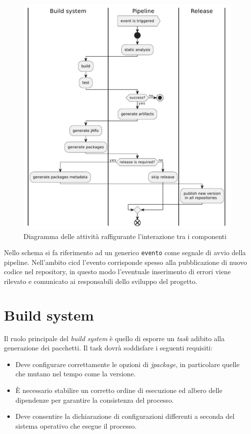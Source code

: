 \begin{figure}[H]
	\centering
	\includegraphics[width=.9\linewidth]{figures/activity-interaction-diagram.pdf}
	\caption{Diagramma delle attività raffigurante l'interazione tra i componenti}
	\label{fig:activity-interaction-diagram}
\end{figure}

Nello schema si fa riferimento ad un generico \texttt{evento} come segnale di avvio della pipeline. Nell'ambito \ac{cicd} l'evento corrisponde spesso alla pubblicazione di nuovo codice nel repository, in questo modo l'eventuale inserimento di errori viene rilevato e comunicato ai responsabili dello sviluppo del progetto.

\section{Build system}

Il ruolo principale del \textit{build system} è quello di esporre un \textit{task} adibito alla generazione dei pacchetti. Il task dovrà soddisfare i seguenti requisiti:
\begin{itemize}
	\item Deve configurare correttamente le opzioni di \textit{jpackage}, in particolare quelle che mutano nel tempo come la versione.
	\item È necessario stabilire un corretto ordine di esecuzione ed albero delle dipendenze per garantire la consistenza del processo.
	\item Deve consentire la dichiarazione di configurazioni differenti a seconda del sistema operativo che esegue il processo.
\end{itemize}

